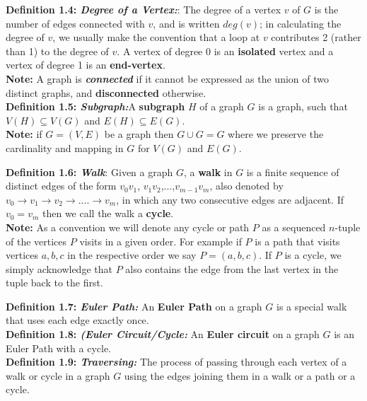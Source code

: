 \documentclass[12pt, fullpage]{article}
\begin{document}
\textbf{Definition 1.4: \textit{Degree of a Vertex:}}: The degree of a vertex $v$ of $G$ is the number of edges connected with $v$, and is written
$deg(v)$; in calculating the degree of $v$, we usually make the convention that a loop at $v$
contributes 2 (rather than 1) to the degree of $v$. A vertex of degree 0 is an \textbf{isolated} vertex and a vertex of degree 1 is an \textbf{end-vertex}.\\

\textbf{Note:} A graph is \textit{\textbf{connected}} if it cannot be expressed as the union of two distinct graphs, and \textbf{disconnected} otherwise. \\

\textbf{Definition 1.5: \textit{Subgraph:}}A \textbf{subgraph} $H$ of a graph $G$ is a graph, such that $V(H) \subseteq V(G)$ and $E(H) \subseteq E(G)$.\\

\textbf{Note:} if $G=(V,E)$ be a graph then $G \cup G = G$ where we preserve the cardinality and mapping in $G$ for $V(G)$ and $E(G)$.

\textbf{Definition 1.6: \textit{Walk}}: Given a graph $G$, a \textbf{walk} in $G$ is a finite sequence of distinct edges of the form $v_0v_1$, $v_1v_2$,...,$v_{m-1}v_m$, also denoted by $v_0 \rightarrow v_1 \rightarrow v_2 \rightarrow ....\rightarrow v_m$, in which any two consecutive edges are adjacent.  If $v_0 = v_m$ then we call the walk a \textbf{cycle}.\\
 \textbf{Note:} As a convention we will denote any cycle or path $P$ as a sequenced $n$-tuple of the vertices $P$ visits in a given order. For example if $P$ is a path that visits vertices $a,b,c$ in the respective order we say $P = (a,b,c)$. If $P$ is a cycle, we simply acknowledge that $P$ also contains the edge from the last vertex in the tuple back to the first.\newline

\textbf{Definition 1.7: \textit{Euler Path: }}An \textbf{Euler Path} on a graph $G$ is a special walk that uses each edge exactly once.\\

\textbf{Definition 1.8: \textit{(Euler Circuit/Cycle: }}An \textbf{Euler circuit} on a graph $G$ is an Euler Path with a cycle.\\

\textbf{Definition 1.9: \textit{Traversing: }}The process of passing through each vertex of a  walk or cycle in a graph $G$ using the edges joining them in a walk or a path or a cycle.\\
\end{document}
